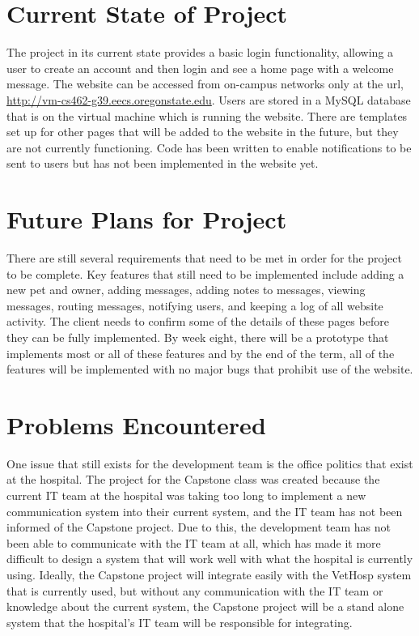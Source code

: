 \documentclass[onecolumn, draftclsnofoot,10pt, compsoc]{IEEEtran}
\begin{document}
\section{Current State of Project}
The project in its current state provides a basic login functionality, allowing a user to create an account and then login and see a home page with a welcome message. The website can be accessed from on-campus networks only at the url, \url{http://vm-cs462-g39.eecs.oregonstate.edu}. Users are stored in a MySQL database that is on the virtual machine which is running the website. There are templates set up for other pages that will be added to the website in the future, but they are not currently functioning. Code has been written to enable notifications to be sent to users but has not been implemented in the website yet.


\section{Future Plans for Project}
There are still several requirements that need to be met in order for the project to be complete. Key features that still need to be implemented include adding a new pet and owner, adding messages, adding notes to messages, viewing messages, routing messages, notifying users, and keeping a log of all website activity. The client needs to confirm some of the details of these pages before they can be fully implemented. By week eight, there will be a prototype that implements most or all of these features and by the end of the term, all of the features will be implemented with no major bugs that prohibit use of the website.

\section{Problems Encountered}
One issue that still exists for the development team is the office politics that exist at the hospital. The project for the Capstone class was created because the current IT team at the hospital was taking too long to implement a new communication system into their current system, and  the IT team has not been informed of the Capstone project. Due to this, the development team has not been able to communicate with the IT team at all, which has made it more difficult to design a system that will work well with what the hospital is currently using. Ideally, the Capstone project will integrate easily with the VetHosp system that is currently used, but without any communication with the IT team or knowledge about the current system, the Capstone project will be a stand alone system that the hospital's IT team will be responsible for integrating. 
\end{document}
